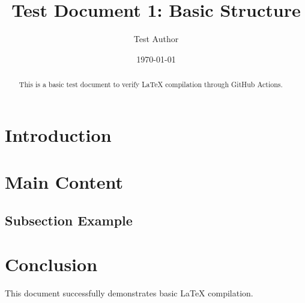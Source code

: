 \documentclass[11pt]{article}
\title{Test Document 1: Basic Structure}
\author{Test Author}
\date{\today}
\begin{document}
\maketitle

\begin{abstract}
This is a basic test document to verify LaTeX compilation through GitHub Actions.
\end{abstract}

\section{Introduction}
\lipsum[1]

\section{Main Content}
\lipsum[2-3]

\subsection{Subsection Example}
\lipsum[4]

\section{Conclusion}
This document successfully demonstrates basic LaTeX compilation.
\end{document}
